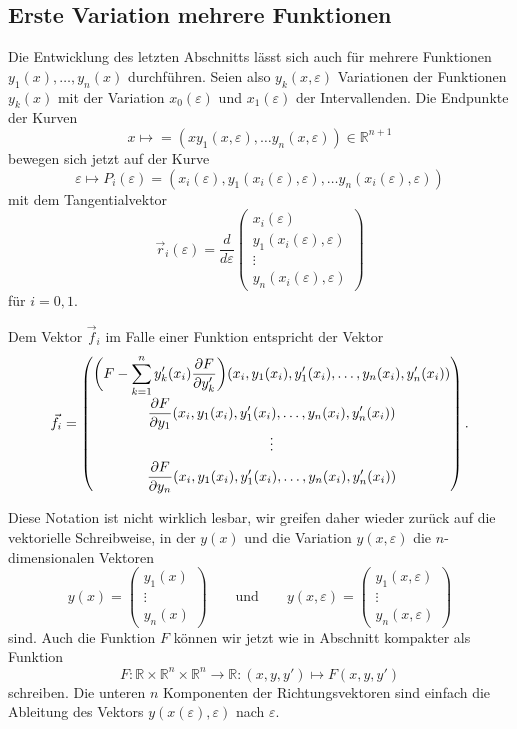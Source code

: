 %
%
\subsection{Erste Variation mehrere Funktionen
\label{buch:variation:allgemein:subsection:var1n}}
Die Entwicklung des letzten Abschnitts lässt sich auch für mehrere
Funktionen $y_1(x),\dots,y_n(x)$ durchführen.
Seien also $y_k(x,\varepsilon)$ Variationen der Funktionen $y_k(x)$
mit der Variation $x_0(\varepsilon)$ und $x_1(\varepsilon)$ der 
Intervallenden.
Die Endpunkte der Kurven
\[
x\mapsto
=
(x
y_1(x,\varepsilon),\dots
y_n(x,\varepsilon))
\in \mathbb{R}^{n+1}
\]
bewegen sich jetzt auf der Kurve
\[
\varepsilon
\mapsto
P_i(\varepsilon)
=
(x_i(\varepsilon),
y_1(x_i(\varepsilon),\varepsilon),
\dots
y_n(x_i(\varepsilon),\varepsilon))
\]
mit dem Tangentialvektor
\[
\vec{r}_i(\varepsilon)
=
\frac{d}{d\varepsilon}
\begin{pmatrix}
x_i(\varepsilon)\\
y_1(x_i(\varepsilon),\varepsilon)\\
\vdots\\
y_n(x_i(\varepsilon),\varepsilon)
\end{pmatrix}
\]
für $i=0,1$.

Dem Vektor $\vec{f}_i$ im Falle einer Funktion entspricht der Vektor
\[
\vec{f}_i
=
\renewcommand{\arraystretch}{1.8}
\begin{pmatrix}
\displaystyle
\biggl(
F%
-
\sum_{k=1}^n y'_k(x_i) \frac{\partial F}{\partial y_k'}
\biggr)
(x_i,y_1(x_i),y'_1(x_i),\dots,y_n(x_i),y_n'(x_i))
\\
\displaystyle
\frac{\partial F}{\partial y_1}
(x_i,y_1(x_i),y'_1(x_i),\dots,y_n(x_i),y_n'(x_i))
\\
\vdots
\\
\displaystyle
\frac{\partial F}{\partial y_n}
(x_i,y_1(x_i),y'_1(x_i),\dots,y_n(x_i),y_n'(x_i))
\end{pmatrix}.
\]

Diese Notation ist nicht wirklich lesbar, wir greifen daher wieder
zurück auf die vektorielle Schreibweise, in der 
$y(x)$ und die Variation $y(x,\varepsilon)$ die $n$-dimensionalen
Vektoren
\[
y(x)
=
\begin{pmatrix}
y_1(x)\\
\vdots\\
y_n(x)
\end{pmatrix}
\qquad
\text{und}
\qquad
y(x,\varepsilon)
=
\begin{pmatrix}
y_1(x,\varepsilon)\\
\vdots\\
y_n(x,\varepsilon)
\end{pmatrix}
\]
sind.
Auch die Funktion $F$ können wir jetzt wie in Abschnitt
kompakter als
Funktion
\[
F\colon
\mathbb{R}\times \mathbb{R}^n\times\mathbb{R}^n
\to
\mathbb{R}
:
(x,y,y')
\mapsto
F(x,y,y')
\]
schreiben.
Die unteren $n$ Komponenten der Richtungsvektoren sind einfach
die Ableitung des Vektors
$y(x(\varepsilon),\varepsilon)$ nach $\varepsilon$.

